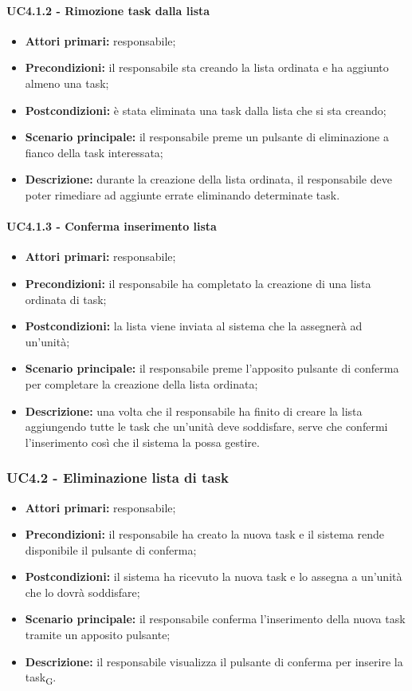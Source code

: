\paragraph{UC4.1.2 - Rimozione task dalla lista}
\begin{itemize}
	\item 	\textbf{Attori primari:} responsabile;
	\item 	\textbf{Precondizioni:} il responsabile sta creando la lista ordinata e ha aggiunto almeno una task;
	\item 	\textbf{Postcondizioni:} è stata eliminata una task dalla lista che si sta creando;
	\item 	\textbf{Scenario principale:} il responsabile preme un pulsante di eliminazione a fianco della task interessata;
	\item 	\textbf{Descrizione:} durante la creazione della lista ordinata, il responsabile deve poter rimediare ad aggiunte errate eliminando determinate task.
\end{itemize}
\paragraph{UC4.1.3 - Conferma inserimento lista}
\begin{itemize}
	\item 	\textbf{Attori primari:} responsabile;
	\item 	\textbf{Precondizioni:} il responsabile ha completato la creazione di una lista ordinata di task;
	\item 	\textbf{Postcondizioni:} la lista viene inviata al sistema che la assegnerà ad un'unità;
	\item 	\textbf{Scenario principale:} il responsabile preme l'apposito pulsante di conferma per completare la creazione della lista ordinata;
	\item 	\textbf{Descrizione:} una volta che il responsabile ha finito di creare la lista aggiungendo tutte le task che un'unità deve soddisfare, serve che confermi l'inserimento così che il sistema la possa gestire.
	
\end{itemize}


\subsubsection{UC4.2 - Eliminazione lista di task}

\begin{itemize}
	\item 	\textbf{Attori primari:} responsabile;
	\item 	\textbf{Precondizioni:} il responsabile ha creato la nuova task e il sistema rende disponibile il pulsante di conferma;
	\item 	\textbf{Postcondizioni:} il sistema ha ricevuto la nuova task e lo assegna a un'unità che lo dovrà soddisfare;
	\item 	\textbf{Scenario principale:} il responsabile conferma l'inserimento della nuova task tramite un apposito pulsante;
	\item 	\textbf{Descrizione:} il responsabile visualizza il pulsante di conferma per inserire la task\textsubscript{G}.
\end{itemize}


